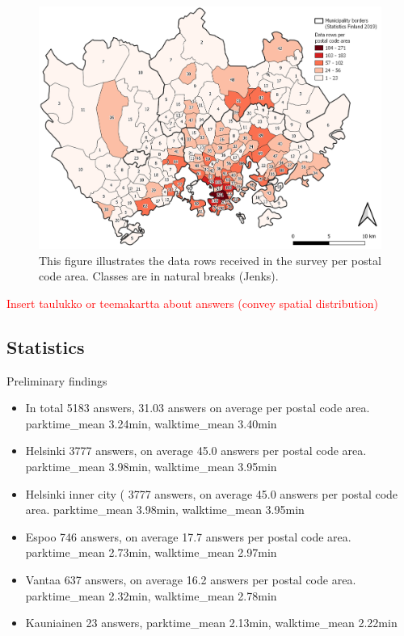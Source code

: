 \begin{figure}[H]%
    \includegraphics[width=\textwidth]{images/thesis_postalvis_answers.png}
    \caption[Data rows received per postal code area]{This figure illustrates the data rows received in the survey per postal code area. Classes are in natural breaks (Jenks).}%
    \label{fig:postalvis_answers}%
\end{figure}

\textcolor{red}{Insert taulukko or teemakartta about answers (convey spatial distribution)}

\subsection{Statistics}
\justify

Preliminary findings
\begin{itemize}
    \item In total 5183 answers, 31.03 answers on average per postal code area. parktime\_mean 3.24min, walktime\_mean 3.40min
    \item Helsinki 3777 answers, on average 45.0 answers per postal code area. parktime\_mean 3.98min, walktime\_mean 3.95min
    \item Helsinki inner city ( 3777 answers, on average 45.0 answers per postal code area. parktime\_mean 3.98min, walktime\_mean 3.95min
    \item Espoo 746 answers, on average 17.7 answers per postal code area. parktime\_mean 2.73min, walktime\_mean 2.97min
    \item Vantaa 637 answers, on average 16.2 answers per postal code area. parktime\_mean 2.32min, walktime\_mean 2.78min
    \item Kauniainen 23 answers, parktime\_mean 2.13min, walktime\_mean 2.22min
\end{itemize}